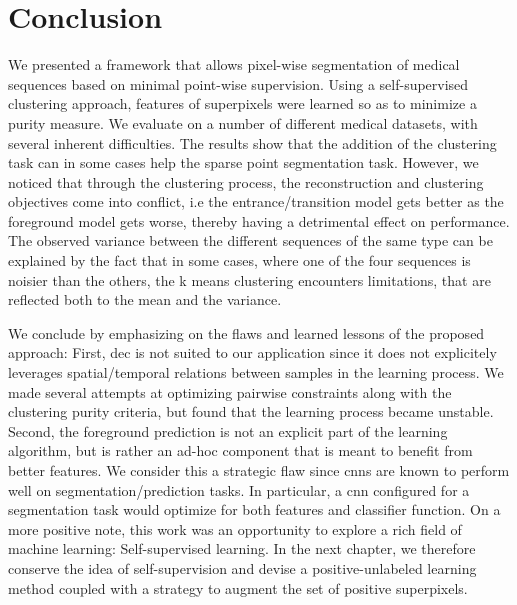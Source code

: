 \section{Conclusion}
\label{sec:conclusion}

We presented a framework that allows pixel-wise segmentation of medical sequences based on minimal point-wise supervision.
Using a self-supervised clustering approach, features of superpixels were learned so as to minimize a purity measure.
We evaluate on a number of different medical datasets, with several inherent difficulties.
The results show that the addition of the clustering task can in some cases help the sparse point segmentation task.
However, we noticed that through the clustering process, the reconstruction and clustering objectives come into conflict, i.e the entrance/transition model gets better as the foreground model gets worse, thereby having a detrimental effect on performance.
The observed variance between the different sequences of the same type can be explained by the fact that in some cases, where one of the four sequences is noisier than the others, the k means clustering encounters limitations, that are reflected both to the mean and the variance.

We conclude by emphasizing on the flaws and learned lessons of the proposed approach:
First, \gls{dec} is not suited to our application since it does not explicitely leverages spatial/temporal relations between samples in the learning process.
We made several attempts at optimizing pairwise constraints along with the clustering purity criteria, but found that the learning process became unstable.
Second, the foreground prediction is not an explicit part of the learning algorithm, but is rather an ad-hoc component that is meant to benefit from better features.
We consider this a strategic flaw since \gls{cnn}s are known to perform well on segmentation/prediction tasks.
In particular, a \gls{cnn} configured for a segmentation task would optimize for both features and classifier function.
On a more positive note, this work was an opportunity to explore a rich field of machine learning: Self-supervised learning.
In the next chapter, we therefore conserve the idea of self-supervision and devise a positive-unlabeled learning method coupled with a strategy to augment the set of positive superpixels.

